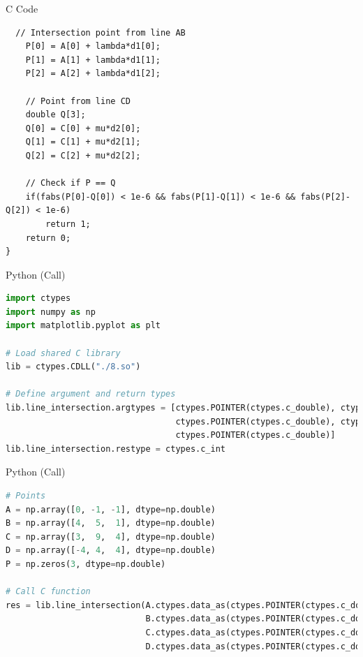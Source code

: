 \documentclass{beamer}
\begin{document}
\begin{frame}[fragile]{C Code}
\begin{lstlisting}
  // Intersection point from line AB
    P[0] = A[0] + lambda*d1[0];
    P[1] = A[1] + lambda*d1[1];
    P[2] = A[2] + lambda*d1[2];

    // Point from line CD
    double Q[3];
    Q[0] = C[0] + mu*d2[0];
    Q[1] = C[1] + mu*d2[1];
    Q[2] = C[2] + mu*d2[2];

    // Check if P == Q
    if(fabs(P[0]-Q[0]) < 1e-6 && fabs(P[1]-Q[1]) < 1e-6 && fabs(P[2]-Q[2]) < 1e-6)
        return 1;
    return 0;
}

\end{lstlisting}
\end{frame}
\begin{frame}[fragile]{Python (Call)}
\begin{lstlisting}[language=Python]
import ctypes
import numpy as np
import matplotlib.pyplot as plt

# Load shared C library
lib = ctypes.CDLL("./8.so")

# Define argument and return types
lib.line_intersection.argtypes = [ctypes.POINTER(ctypes.c_double), ctypes.POINTER(ctypes.c_double),
                                  ctypes.POINTER(ctypes.c_double), ctypes.POINTER(ctypes.c_double),
                                  ctypes.POINTER(ctypes.c_double)]
lib.line_intersection.restype = ctypes.c_int
\end{lstlisting}
\end{frame}

\begin{frame}[fragile]{Python (Call)}
\begin{lstlisting}[language=Python]
# Points
A = np.array([0, -1, -1], dtype=np.double)
B = np.array([4,  5,  1], dtype=np.double)
C = np.array([3,  9,  4], dtype=np.double)
D = np.array([-4, 4,  4], dtype=np.double)
P = np.zeros(3, dtype=np.double)

# Call C function
res = lib.line_intersection(A.ctypes.data_as(ctypes.POINTER(ctypes.c_double)),
                            B.ctypes.data_as(ctypes.POINTER(ctypes.c_double)),
                            C.ctypes.data_as(ctypes.POINTER(ctypes.c_double)),
                            D.ctypes.data_as(ctypes.POINTER(ctypes.c_double)),
                           
\end{lstlisting}
\end{frame}
\end{document}
